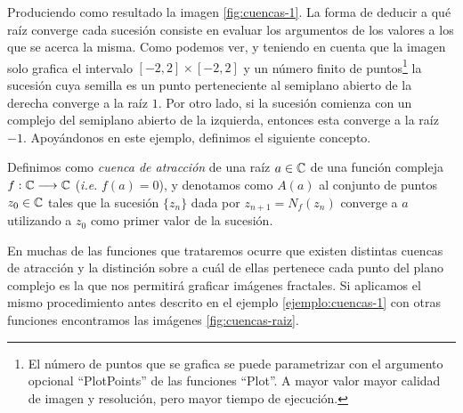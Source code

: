 \begin{ejemplo}
Produciendo como resultado la imagen \ref{fig:cuencas-1}. La forma de deducir a qué raíz converge cada sucesión consiste en evaluar los argumentos de los valores a los que se acerca la misma. Como podemos ver, y teniendo en cuenta que la imagen solo grafica el intervalo $[-2,2]\times[-2,2]$ y un número finito de puntos\footnote{El número de puntos que se grafica se puede parametrizar con el argumento opcional ``PlotPoints'' de las funciones ``Plot''. A mayor valor mayor calidad de imagen y resolución, pero mayor tiempo de ejecución.} la sucesión cuya semilla es un punto perteneciente al semiplano abierto de la derecha converge a la raíz $1$. Por otro lado, si la sucesión comienza con un complejo del semiplano abierto de la izquierda, entonces esta converge a la raíz $-1$. Apoyándonos en este ejemplo, definimos el siguiente concepto.
\end{ejemplo}


\begin{definicion}
    Definimos como \textit{cuenca de atracción} de una raíz $a\in\mathbb{C}$ de una función compleja $f:\mathbb{C}\longrightarrow\mathbb{C}$ (\textit{i.e.} $f(a)=0$), y denotamos como $A(a)$ al conjunto de puntos $z_0\in\mathbb{C}$ tales que la sucesión $\{z_n\}$ dada por $z_{n+1}=N_f(z_n)$ converge a $a$ utilizando a $z_0$ como primer valor de la sucesión. 
\end{definicion}

En muchas de las funciones que trataremos ocurre que existen distintas cuencas de atracción y la distinción sobre a cuál de ellas pertenece cada punto del plano complejo es la que nos permitirá graficar imágenes fractales. Si aplicamos el mismo procedimiento antes descrito en el ejemplo \ref{ejemplo:cuencas-1} con otras funciones encontramos las imágenes \ref{fig:cuencas-raiz}.

